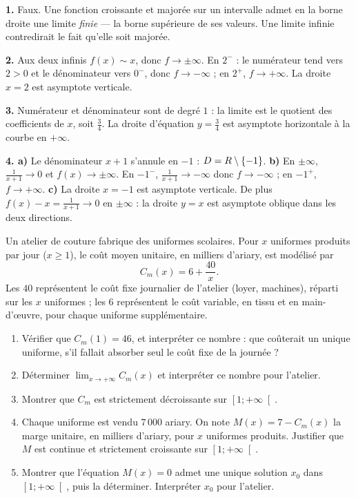 \begin{corrige}[annales]
\textbf{1.} Faux. Une fonction croissante et majorée sur un intervalle admet
en la borne droite une limite \emph{finie} — la borne supérieure de ses
valeurs. Une limite infinie contredirait le fait qu'elle soit majorée.

\textbf{2.} Aux deux infinis $f(x) \sim x$, donc $f \to \pm\infty$. En $2^{-}$ :
le numérateur tend vers $2>0$ et le dénominateur vers $0^{-}$, donc
$f \to -\infty$ ; en $2^{+}$, $f \to +\infty$. La droite $x = 2$ est asymptote
verticale.

\textbf{3.} Numérateur et dénominateur sont de degré $1$ : la limite est le
quotient des coefficients de $x$, soit $\frac34$. La droite d'équation
$y = \frac34$ est asymptote horizontale à la courbe en $+\infty$.

\textbf{4. a)} Le dénominateur $x+1$ s'annule en $-1$ :
$D = R\setminus\{-1\}$.
\textbf{b)} En $\pm\infty$, $\frac{1}{x+1}\to0$ et $f(x)\to\pm\infty$. En
$-1^{-}$, $\frac{1}{x+1}\to-\infty$ donc $f\to-\infty$ ; en $-1^{+}$,
$f\to+\infty$.
\textbf{c)} La droite $x = -1$ est asymptote verticale. De plus
$f(x)-x = \frac{1}{x+1}\to0$ en $\pm\infty$ : la droite $y = x$ est asymptote
oblique dans les deux directions.
\end{corrige}

\begin{jecherche}
Un atelier de couture fabrique des uniformes scolaires. Pour $x$ uniformes
produits par jour ($x \geq 1$), le coût moyen unitaire, en milliers d'ariary,
est modélisé par
\[
  C_{m}(x) = 6 + \frac{40}{x}.
\]
Les $40$ représentent le coût fixe journalier de l'atelier (loyer, machines),
réparti sur les $x$ uniformes ; les $6$ représentent le coût variable, en
tissu et en main-d'œuvre, pour chaque uniforme supplémentaire.

\begin{enumerate}[label=\textbf{\arabic*.}, leftmargin=*, itemsep=0.3em]
  \item Vérifier que $C_{m}(1) = 46$, et interpréter ce nombre : que
        coûterait un unique uniforme, s'il fallait absorber seul le coût
        fixe de la journée ?
  \item Déterminer $\lim_{x \to +\infty} C_{m}(x)$ et interpréter ce nombre
        pour l'atelier.
  \item Montrer que $C_{m}$ est strictement décroissante sur
        $\left[1 ; +\infty\right[$.
  \item Chaque uniforme est vendu $7\,000$ ariary. On note
        $M(x) = 7 - C_{m}(x)$ la marge unitaire, en milliers d'ariary, pour
        $x$ uniformes produits. Justifier que $M$ est continue et
        strictement croissante sur $\left[1 ; +\infty\right[$.
  \item Montrer que l'équation $M(x) = 0$ admet une unique solution
        $x_{0}$ dans $\left[1 ; +\infty\right[$, puis la déterminer.
        Interpréter $x_{0}$ pour l'atelier.
\end{enumerate}
\end{jecherche}

